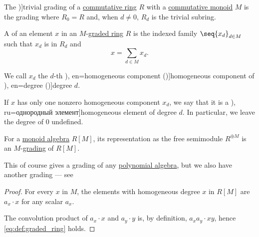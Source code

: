 \begin{definition}\label{def:trivial_ring_grading}
  The \term[en=trivial (graduation) (\cite[457]{Bourbaki1998Algebra1to3})]{trivial grading} of a \hyperref[def:ring/commutative]{commutative ring} \( R \) with a \hyperref[def:monoid/commutative]{commutative monoid} \( M \) is the grading where \( R_0 = R \) and, when \( d \neq 0 \), \( R_d \) is the trivial subring.
\end{definition}

\begin{definition}\label{def:homogeneous_element}
  A  of an element \( x \) in an \( M \)-\hyperref[def:graded_ring]{graded ring} \( R \) is the indexed family \( \seq{ x_d }_{d \in M} \) such that \( x_d \) is in \( R_d \) and
  \begin{equation}
    x = \sum_{d \in M} x_d.
  \end{equation}

  We call \( x_d \) the \( d \)-th \term[bg=еднородна компонента (\cite[57]{КоцевСидеров2016КомАлгебра}), en=homogeneous component (\cite[363]{Bourbaki1998Algebra1to3})]{homogeneous component} of \term[bg=степен (\cite[57]{КоцевСидеров2016КомАлгебра}), en=degree (\cite[363]{Bourbaki1998Algebra1to3})]{degree} \( d \).

  If \( x \) has only one nonzero homogeneous component \( x_d \), we say that it is a \term[bg=еднороден елемент (\cite[57]{КоцевСидеров2016КомАлгебра}), ru=однородный элемент]{homogeneous element} of degree \( d \). In particular, we leave the degree of \( 0 \) undefined.
\end{definition}

\begin{proposition}\label{thm:semigroup_algebra_grading}
  For a \hyperref[def:semigroup_algebra]{monoid algebra} \( R[M] \), its representation as the free semimodule \( R^{\oplus M} \) is an \( M \)-\hyperref[def:graded_ring]{grading} of \( R[M] \).
\end{proposition}
\begin{comments}
  \item This of course gives a grading of any \hyperref[def:polynomial_algebra]{polynomial algebra}, but we also have another grading --- see 
\end{comments}
\begin{proof}
  For every \( x \) in \( M \), the elements with homogeneous degree \( x \) in \( R[M] \) are \( a_x \cdot x \) for any scalar \( a_x \).

  The convolution product of \( a_x \cdot x \) and \( a_y \cdot y \) is, by definition, \( a_x a_y \cdot xy \), hence \eqref{eq:def:graded_ring} holds.
\end{proof}

